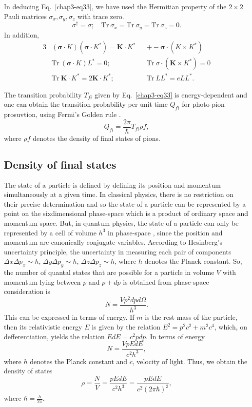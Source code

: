 In deducing Eq.\ \eqref{chap3-eq33}, we have used the Hermitian property of the $2 \times 2$ Pauli matrices $\sigma_x, \sigma_y, \sigma_z$ with trace zero.
$$
\sigma^\dagger = \sigma; \quad \text{Tr}~ \sigma_x = \text{Tr}~ \sigma_y = \text{Tr}~ \sigma_z =0.
$$
In addition,
\begin{alignat*}{3}
  &({\boldsymbol  \sigma \cdot K}) ({\boldsymbol  \sigma \cdot K}^\ast) = {\boldsymbol  K \cdot K}^\ast && + - {\boldsymbol  \sigma \cdot (K \times K^\ast)}\\
  & \text{Tr}~  ({\boldsymbol  \sigma \cdot K})L^\ast =0; && \text{Tr}~ \sigma \cdot ({\boldsymbol  K \times K}^\ast)=0\\
  & \text{Tr}~ {\boldsymbol  K \cdot K}^\ast = 2 {\boldsymbol  K \cdot K}^\ast; & &\text{Tr}~LL^\ast = e LL^\ast.
\end{alignat*}

The transition probability $T_{fi}$ given by Eq.\ \eqref{chap3-eq33} is energy-dependent and one can obtain the transition probability per unit time $Q_{fi}$ for photo-pion prosuvtion, using Fermi's Golden rule \cite{chap3-key23}.
\begin{equation}
  Q_{fi}= \frac{2 \pi}{\hbar} T_{fi} \rho f, \label{chap3-eq34}
\end{equation}
where $\rho f$ denotes the density of final states of pions.

\subsection{Density of final states}\label{chap3-sec4.1}

The state of a particle is defined by defining its position and momentum simultaneously at a given time. In classical physics, there is no restriction on their precise determination and so the state of a particle can be represented by a point on the sixdimensional phase-space which is a product of ordinary space and momentum space. But, in quantum physics, the state of a particle can only be represented by a cell of volume $h^3$ in phase-space \cite{chap3-key24}, since the position and momentum are canonically conjugate variables. According to Hesinberg’s uncertainty principle, the uncertainty in measuring each pair of components $\Delta x \Delta p_x \sim h$, $\Delta y \Delta p_y \sim h$, $\Delta z \Delta p_z \sim h$, where $h$ denotes the Planck constant. So, the number of quantal states that are possible for a particle in volume $V$ with momentum lying between $p$ and $p + dp$ is obtained from phase-space consideration \cite{chap3-key24} is
$$
N = \frac{Vp^2 dpd\Omega}{h^3}.
$$
This can be expressed in terms of energy. If $m$ is the rest mass of the particle, then its relativistic energy $E$ is given by the relation $E^2= p^2 c^2+ m^2 c^4$, which, on defferentiation, yields the relation $EdE=c^2pdp$. In terms of energy
$$
N= \frac{Vp{EdE}}{c^2 h^3},
$$
where $h$ denotes the Planck constant and $c$, velocity of light. Thus, we obtain the density of states
$$
\rho = \frac{N}{V} = \frac{p{EdE}}{c^2 h^3} = \frac{p{EdE}}{c^2 (2\pi \hbar)^3},
$$
where $\hbar = \tfrac{h}{2\pi}$.


